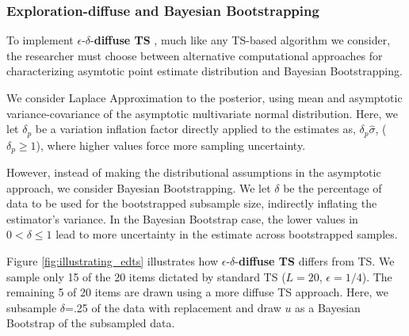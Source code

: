 \documentclass[nonblindrev]{informs3}
\newcommand{\edts}{$\epsilon$-$\delta$-\textbf{diffuse TS} }
\newcommand{\numperset}{L}
\begin{document}
\subsubsection{Exploration-diffuse and Bayesian Bootstrapping}

To implement \edts, much like any TS-based algorithm we consider, the researcher must choose between alternative computational approaches for characterizing asymtotic point estimate distribution and Bayesian Bootstrapping. 

We consider Laplace Approximation to the posterior, using mean and asymptotic variance-covariance of the asymptotic multivariate normal distribution. Here, we let $\delta_p$ be a variation inflation factor directly applied to the estimates as, $\delta_p  \hat \sigma$, ($\delta_p \geq 1$), where higher values force more sampling uncertainty.

However, instead of making the distributional assumptions in the asymptotic approach, we consider Bayesian Bootstrapping. We let $\delta$ be the percentage of data to be used for the bootstrapped subsample size, indirectly inflating the estimator's variance. In the Bayesian Bootstrap case, the lower values in $0 < \delta \leq 1$ lead to more uncertainty in the estimate across bootstrapped samples.

Figure \ref{fig:illustrating_edts} illustrates how \edts differs from TS. We sample only 15 of the 20 items dictated by standard TS ($\numperset=20$, $\epsilon=1/4$). The remaining 5 of 20 items are drawn using a more diffuse TS approach. Here, we subsample $\delta$=.25 of the data with replacement and draw $u$ as a Bayesian Bootstrap of the subsampled data. 
\end{document}
